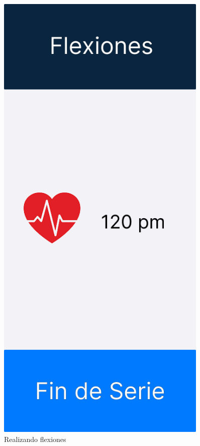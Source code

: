 \begin{figure}[H]
   \centering
   \begin{minipage}{0.45\textwidth}
      \centering
      \includegraphics[width=0.9\textwidth]{fotos/Frame 3.png}
      \caption{Realizando flexiones}

\end{minipage}
\end{figure}
